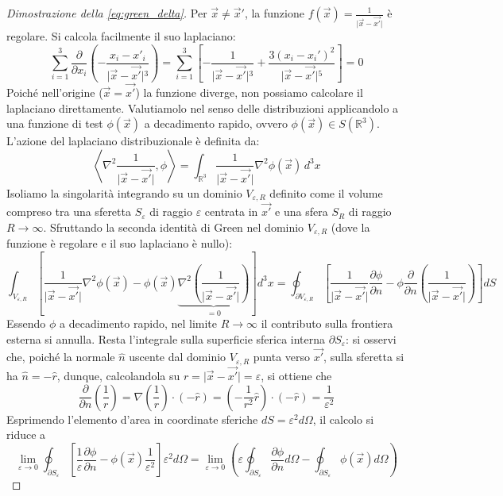 \begin{proof}[Dimostrazione della \eqref{eq:green_delta}]
Per $\vec{x} \neq \vec{x}'$, la funzione $f(\vec{x}) = \frac{1}{\vert{}\vec{x}-\vec{x'}\vert{}}$ è regolare. Si calcola facilmente il suo laplaciano:
$$
\sum_{i=1}^3 \frac{\partial}{\partial x_i} \left( -\frac{x_i - x'_i}{\vert{}\vec{x}-\vec{x'}\vert{}^3} \right) = \sum_{i=1}^3 \left[ -\frac{1}{\vert{}\vec{x}-\vec{x'}\vert{}^3} + \frac{3(x_i - x_i')^2}{\vert{}\vec{x}-\vec{x'}\vert{}^5} \right] = 0
$$
Poiché nell'origine ($\vec{x} = \vec{x'}$) la funzione diverge, non possiamo calcolare il laplaciano direttamente. Valutiamolo nel senso delle distribuzioni applicandolo a una funzione di test $\phi(\vec{x})$ a decadimento rapido, ovvero $\phi(\vec{x}) \in S(\mathbb{R}^3)$. 
L'azione del laplaciano distribuzionale è definita da:
$$
\left\langle \nabla^2 \frac{1}{\vert{}\vec{x}-\vec{x'}\vert{}}, \phi \right\rangle = \int_{\mathbb{R}^3} \frac{1}{\vert{}\vec{x}-\vec{x'}\vert{}} \nabla^2 \phi(\vec{x}) \, d^3 x
$$
Isoliamo la singolarità integrando su un dominio $V_{\varepsilon, R}$ definito come il volume compreso tra una sferetta $S_\varepsilon$ di raggio $\varepsilon$ centrata in $\vec{x'}$ e una sfera $S_R$ di raggio $R \to \infty$. Sfruttando la seconda identità di Green nel dominio $V_{\varepsilon, R}$ (dove la funzione è regolare e il suo laplaciano è nullo):
$$
\int_{V_{\varepsilon, R}} \left[ \frac{1}{\vert{}\vec{x}-\vec{x'}\vert{}} \nabla^2 \phi(\vec{x}) - \phi(\vec{x}) \underbrace{{\nabla^2 \left( \frac{1}{\vert{}\vec{x}-\vec{x'}\vert{}} \right)}}_{=0} \right] d^3 x = \oint_{\partial V_{\varepsilon, R}} \left[ \frac{1}{\vert{}\vec{x}-\vec{x'}\vert{}} \frac{\partial \phi}{\partial n} - \phi \frac{\partial}{\partial n} \left( \frac{1}{\vert{}\vec{x}-\vec{x'}\vert{}} \right) \right] dS$$
Essendo $\phi$ a decadimento rapido, nel limite $R \to \infty$ il contributo sulla frontiera esterna si annulla. Resta l'integrale sulla superficie sferica interna $\partial S_\varepsilon$: si osservi che, poiché la normale $\hat{n}$ uscente dal dominio $V_{\varepsilon, R}$ punta verso $\vec{x'}$, sulla sferetta si ha $\hat{n} = -\hat{r}$, dunque, calcolandola su $r = \vert{}\vec{x}-\vec{x'}\vert{} = \varepsilon$, si ottiene che
$$
\frac{\partial}{\partial n} \left( \frac{1}{r} \right) = \nabla \left( \frac{1}{r} \right) \cdot (-\hat{r}) = \left( -\frac{1}{r^2} \hat{r} \right) \cdot (-\hat{r}) = \frac{1}{\varepsilon^2}
$$
Esprimendo l'elemento d'area in coordinate sferiche $dS = \varepsilon^2 d\Omega$, il calcolo si riduce a
$$
\lim_{\varepsilon \to 0} \oint_{\partial S_\varepsilon} \left[ \frac{1}{\varepsilon} \frac{\partial \phi}{\partial n} - \phi(\vec{x}) \frac{1}{\varepsilon^2} \right] \varepsilon^2 d\Omega = \lim_{\varepsilon \to 0} \left( \varepsilon \oint_{\partial S_\varepsilon} \frac{\partial \phi}{\partial n} d\Omega - \oint_{\partial S_\varepsilon} \phi(\vec{x}) d\Omega \right)$$

\end{proof}
